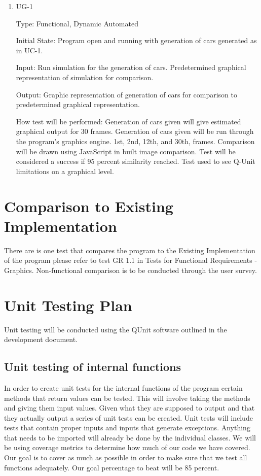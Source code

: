 \documentclass[12pt, titlepage]{article}
\begin{document}
\begin{enumerate}

\item{UG-1\\}

Type: Functional, Dynamic Automated
					
Initial State: Program open and running with generation of cars generated as in 
UC-1.
					
Input: Run simulation for the generation of cars. Predetermined graphical 
representation of simulation for comparison.
					
Output: Graphic representation of generation of cars for comparison to 
predetermined graphical representation.
					
How test will be performed: Generation of cars given will give estimated 
graphical output for 30 frames. Generation of cars given will be run through the 
program's graphics engine. 1st, 2nd, 12th, and 30th, frames. Comparison will be 
drawn using JavaScript in built image comparison. Test will be considered a 
success if 95 percent similarity reached. Test used to see Q-Unit limitations on 
a graphical level.

\end{enumerate}
	
\section{Comparison to Existing Implementation}	
There are is one test that compares the program to the Existing Implementation 
of the program please refer to test GR 1.1 in Tests for Functional Requirements 
- Graphics. Non-functional comparison is to be conducted through the user survey.
				
\section{Unit Testing Plan}

Unit testing will be conducted using the QUnit software outlined in the 
development document.
		
\subsection{Unit testing of internal functions}

In order to create unit tests for the internal functions of the program certain 
methods that return values
can be tested. This will involve taking the methods and giving them input 
values. Given what they are
supposed to output and that they actually output a series of unit tests can be 
created. Unit tests will include
tests that contain proper inputs and inputs that generate exceptions.  Anything 
that needs to be imported will already be done
by the individual classes. We will be using coverage metrics to determine how 
much of our code we have
covered. Our goal is to cover as much as possible in order to make sure that we 
test all functions adequately.
Our goal percentage to beat will be 85 percent.
		
\end{document}
